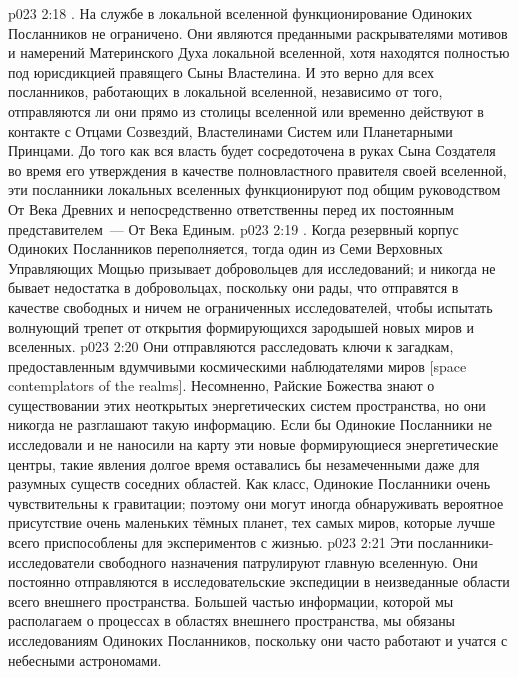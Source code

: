 \vs p023 2:18 . На службе в локальной вселенной функционирование Одиноких Посланников не ограничено. Они являются преданными раскрывателями мотивов и намерений Материнского Духа локальной вселенной, хотя находятся полностью под юрисдикцией правящего Сыны Властелина. И это верно для всех посланников, работающих в локальной вселенной, независимо от того, отправляются ли они прямо из столицы вселенной или временно действуют в контакте с Отцами Созвездий, Властелинами Систем или Планетарными Принцами. До того как вся власть будет сосредоточена в руках Сына Создателя во время его утверждения в качестве полновластного правителя своей вселенной, эти посланники локальных вселенных функционируют под общим руководством От Века Древних и непосредственно ответственны перед их постоянным представителем~--- От Века Единым.
\vs p023 2:19 . Когда резервный корпус Одиноких Посланников переполняется, тогда один из Семи Верховных Управляющих Мощью призывает добровольцев для исследований; и никогда не бывает недостатка в добровольцах, поскольку они рады, что отправятся в качестве свободных и ничем не ограниченных исследователей, чтобы испытать волнующий трепет от открытия формирующихся зародышей новых миров и вселенных.
\vs p023 2:20 Они отправляются расследовать ключи к загадкам, предоставленным вдумчивыми космическими наблюдателями миров [space contemplators of the realms]. Несомненно, Райские Божества знают о существовании этих неоткрытых энергетических систем пространства, но они никогда не разглашают такую информацию. Если бы Одинокие Посланники не исследовали и не наносили на карту эти новые формирующиеся энергетические центры, такие явления долгое время оставались бы незамеченными даже для разумных существ соседних областей. Как класс, Одинокие Посланники очень чувствительны к гравитации; поэтому они могут иногда обнаруживать вероятное присутствие очень маленьких тёмных планет, тех самых миров, которые лучше всего приспособлены для экспериментов с жизнью.
\vs p023 2:21 Эти посланники\hyp{}исследователи свободного назначения патрулируют главную вселенную. Они постоянно отправляются в исследовательские экспедиции в неизведанные области всего внешнего пространства. Большей частью информации, которой мы располагаем о процессах в областях внешнего пространства, мы обязаны исследованиям Одиноких Посланников, поскольку они часто работают и учатся с небесными астрономами.
